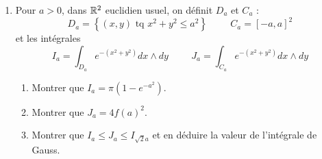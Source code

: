 \begin{enumerate}
\item Pour $a>0$, dans $\mathbb{R}^2$ euclidien usuel, on définit $D_a$  et $C_a$ :
\begin{displaymath}
 D_a=\left\lbrace (x,y)\text{ tq } x^2+y^2\leq a^2\right\rbrace \hspace{1cm} C_a = [-a,a]^2 
\end{displaymath}
et les intégrales
\begin{displaymath}
 I_a = \int_{D_a}e^{-(x^2+y^2)}dx\wedge dy \hspace{1cm} J_a = \int_{C_a}e^{-(x^2+y^2)}dx\wedge dy
\end{displaymath}
\begin{enumerate}
 \item Montrer que $I_a=\pi(1-e^{-a^2})$.
 \item Montrer que $J_a = 4f(a)^2$.
 \item Montrer que $I_a\leq J_a \leq I_{\sqrt{2}a}$ et en déduire la valeur de l'intégrale de Gauss.
\end{enumerate}

  
\end{enumerate}
